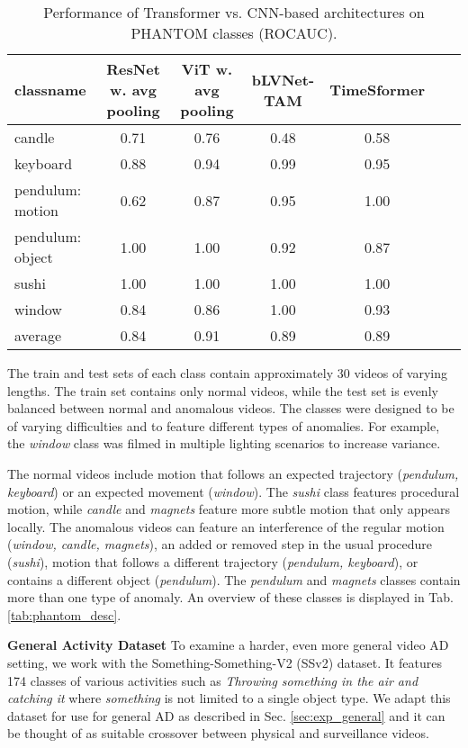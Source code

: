 \documentclass{article}
\begin{document}
\begin{table*}[ht!]
  \centering
  \label{tab:transformers_eval}

    \begin{tabular}{lcccccc}
    \toprule      


	classname	&	ResNet w. avg pooling	&	ViT	w. avg pooling &	bLVNet-TAM 
 	&	TimeSformer \\
\midrule										
	candle	&	0.71	&	0.76	&	0.48	&	0.58	\\
	keyboard	&	0.88	&	0.94	&	0.99	&	0.95	\\
	pendulum: motion	&	0.62	&	0.87	&	0.95	&	1.00	\\
	pendulum: object	&	1.00	&	1.00	&	0.92	&	0.87	\\
	sushi	&	1.00	&	1.00	&	1.00	&	1.00	\\
	window	&	0.84	&	0.86	&	1.00	&	0.93	\\
\midrule										
	average	&	0.84	&	0.91	&	0.89	&	0.89	\\
	 \bottomrule
    \end{tabular}
    \caption{Performance of Transformer vs. CNN-based architectures on PHANTOM classes (ROCAUC). }
\end{table*}

The train and test sets of each class contain approximately 30 videos of varying lengths. The train set contains only normal videos, while the test set is evenly balanced between normal and anomalous videos. The classes were designed to be of varying difficulties and to feature different types of anomalies. For example, the \textit{window} class was filmed in multiple lighting scenarios to increase variance.

The normal videos include motion that follows an expected trajectory (\textit{pendulum, keyboard}) or an expected movement (\textit{window}). The \textit{sushi} class features procedural motion, while \textit{candle} and \textit{magnets} feature more subtle motion that only appears locally. The anomalous videos can feature an interference of the regular motion (\textit{window, candle, magnets}), an added or removed step in the usual procedure (\textit{sushi}), motion that follows a different trajectory (\textit{pendulum, keyboard}),  or contains a different object (\textit{pendulum}). The \textit{pendulum} and \textit{magnets} classes contain more than one type of anomaly. An overview of these classes is displayed in Tab.\ref{tab:phantom_desc}. 


\textbf{General Activity Dataset}
\label{sec:ssv2}
To examine a harder, even more general video AD setting, we work with the Something-Something-V2 (SSv2) dataset. It features 174 classes of various activities such as \textit{Throwing something in the air and catching it} where \textit{something} is not limited to a single object type. We adapt this dataset for use for general AD as described in Sec. \ref{sec:exp_general} and it can be thought of as suitable crossover between physical and surveillance videos. 
\end{document}
